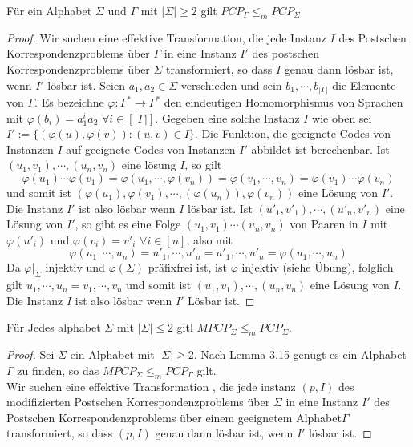     Für ein Alphabet \(\Sigma\) und \(\Gamma\) mit \(|\Sigma| \geq 2\) gilt \(PCP_{\Gamma} \leq_m PCP_{\Sigma}\)
    \begin{proof}
      Wir suchen eine effektive Transformation, die jede Instanz \(I\) des Postschen Korrespondenzproblems über \(\Gamma\) in eine Instanz \(I'\) des postschen Korrespondenzproblems über \(\Sigma\) transformiert, so dass \(I\) genau dann lösbar ist, wenn \(I'\) lösbar ist. Seien \(a_1, a_2 \in \Sigma\) verschieden und sein \(b_1, \cdots, b_{|\Gamma|}\) die Elemente von \(\Gamma\). Es bezeichne \(\varphi : \Gamma^* \to \Gamma^*\) den eindeutigen Homomorphismus von Sprachen mit \(\varphi (b_i) = a^i_1 a_2\) \(\forall i \in [|\Gamma|]\). Gegeben eine solche Instanz \(I\) wie oben sei \(I' := \{(\varphi(u), \varphi(v)) : (u, v) \in I\}\). Die Funktion, die geeignete Codes von Instanzen \(I\) auf geeignete Codes von Instanzen \(I'\) abbildet ist berechenbar. Ist \((u_1, v_1), \cdots, (u_n, v_n)\) eine lösung \(I\), so gilt \[\varphi(u_1) \cdots \varphi(v_1) = \varphi(u_1, \cdots, \varphi(v_n)) = \varphi(v_1, \cdots, v_n) = \varphi(v_1) \cdots \varphi(v_n)\] und somit ist \((\varphi(u_1), \varphi(v_1), \cdots, (\varphi(u_n)), \varphi(v_n))\) eine Lösung von \(I'\). Die Instanz \(I'\) ist also lösbar wenn \(I\) lösbar ist. Ist \((u'_1, v'_1), \cdots, (u'_n, v'_n)\) eine Lösung von \(I'\), so gibt es eine Folge \((u_1, v_1)\cdots (u_n, v_n)\) von Paaren in \(I\) mit \(\varphi(u'_i)\) und \(\varphi(v_i) = v'_i\) \(\forall i \in [n]\), also mit \[\varphi(u_1, \cdots, u_n) = u'_1, \cdots, u'_n = u'_1, \cdots, u'_n =\varphi(u_1, \cdots, u_n)\] Da \(\varphi \vert_{\Sigma}\) injektiv und \(\varphi (\Sigma)\) präfixfrei ist, ist \(\varphi\) injektiv (siehe Übung), folglich gilt \(u_1, \cdots, u_n = v_1, \cdots, v_n\) und somit ist \((u_1, v_1), \cdots, (u_n, v_n)\) eine Lösung von \(I\). Die Instanz \(I\) ist also lösbar wenn \(I'\) Lösbar ist.
    \end{proof}

    Für Jedes alphabet \(\Sigma\) mit \(|\Sigma| \leq 2\) gitl \(MPCP_{\Sigma} \leq_m PCP_{\Sigma}\).
    \begin{proof}
      Sei \(\Sigma\) ein Alphabet mit \(|\Sigma| \geq 2\). Nach \hyperref[subsec:3.15]{Lemma 3.15}  genügt es ein Alphabet \(\Gamma\) zu finden, so das \(MPCP_{\Sigma} \leq_m PCP_{\Gamma}\) gilt. \\Wir suchen eine effektive Transformation , die jede instanz \((p, I)\) des modifizierten Postschen Korrespondenzproblems über \(\Sigma\) in eine Instanz \(I'\) des Postschen Korrespondenzproblems über einem geeignetem Alphabet\(\Gamma\) transformiert, so dass \((p, I)\) genau dann lösbar ist, wenn \(I'\) lösbar ist.
    \end{proof}

